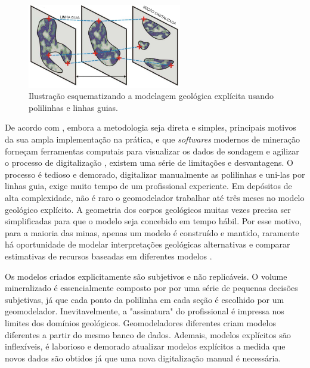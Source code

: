 \begin{figure}[H]
	\caption{\label{explicitmodeling}Ilustração esquematizando a modelagem geológica explícita usando polilinhas e linhas guias.}
	\begin{center}
		\includegraphics[width=0.6\textwidth]{capitulo_1/explicitmodeling}
	\end{center}
\end{figure}

De acordo com , embora a metodologia seja direta e simples, principais motivos da sua ampla implementação na prática, e que \textit{softwares} modernos de mineração forneçam ferramentas computais para visualizar os dados de sondagem e agilizar o processo de digitalização \cite{silvaenhancedgeomodeling}, existem uma série de limitações e desvantagens. O processo é tedioso e demorado, digitalizar manualmente as polilinhas e uni-las por linhas guia, exige muito tempo de um profissional experiente. Em depósitos de alta complexidade, não é raro o geomodelador trabalhar até três meses no modelo geológico explícito. A geometria dos corpos geológicos muitas vezes precisa ser simplificadas para que o modelo seja concebido em tempo hábil. Por esse motivo, para a maioria das minas, apenas um modelo é construído e mantido, raramente há oportunidade de modelar interpretações geológicas alternativas e comparar estimativas de recursos baseadas em diferentes modelos \cite{cowan2003practical}.

Os modelos criados explicitamente são subjetivos e não replicáveis. O volume mineralizado é essencialmente composto por por uma série de pequenas decisões subjetivas, já que cada ponto da polilinha em cada seção é escolhido por um geomodelador. Inevitavelmente, a "assinatura" do profissional é impressa nos limites dos domínios geológicos. Geomodeladores diferentes criam modelos diferentes a partir do mesmo banco de dados. Ademais, modelos explícitos são inflexíveis, é laborioso e demorado atualizar modelos explícitos a medida que novos dados são obtidos já que uma nova digitalização manual é necessária.

